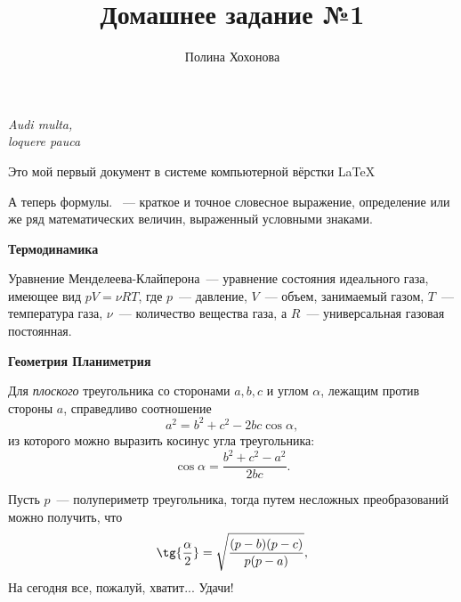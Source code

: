 \documentclass[12pt]{article}
\title{Домашнее задание №1}
\author{Полина Хохонова}
\date{}
\begin{document}
 
   \maketitle 
   \begin{flushright} 
     {\itshape Audi multa,\\ loquere pauca} 
   \end{flushright} 
   \hspace{20 pt} 
   \begin{center} 
     Это мой первый документ в системе компьютерной вёрстки LaTeX
   \end{center}
   \begin{center}
       \large {}
    \end{center}
    А теперь формулы. {}~--- краткое и точное словесное выражение, определение или же ряд математических величин, выраженный условными знаками.
    
    \vspace{15 pt}
    \hspace{28 pt} 
    \large \textbf{Термодинамика} 
    
    Уравнение Менделеева-Клайперона~--- уравнение состояния идеального газа, имеющее вид $pV = \nu RT$, где $p$~--- давление, $V$~--- объем, занимаемый газом, $T$~--- температура газа, $\nu$~--- количество вещества газа, а $R$~--- универсальная газовая постоянная.
    
    \vspace{15 pt}
    \hspace{28 pt}
    \large \textbf{Геометрия  \hfill Планиметрия}
    
    Для \textit{плоского} треугольника со сторонами $a, b, c$ и углом $\alpha$, лежащим против стороны $a$, справедливо соотношение \[a^2 = b^2 + c^2 - 2bc\cos\alpha,\] из которого можно выразить косинус угла треугольника: \[\cos\alpha = \frac{b^2 + c^2 - a^2}{2bc}.\]
    
    
    Пусть $p$~--- полупериметр треугольника, тогда путем несложных преобразований можно получить, что \[\tg{\frac{\alpha}{2}}= \sqrt{\frac{(p - b)(p - c)}{p(p - a)}},\] На сегодня все, пожалуй, хватит... Удачи!
\end{document}
